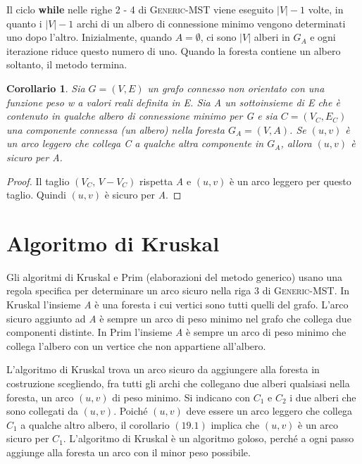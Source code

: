 \documentclass[10pt, a4paper]{report}
\newtheorem{corollario}{Corollario}[chapter]
\begin{document}
Il ciclo \textbf{while} nelle righe 2 - 4 di \textsc{Generic-MST} viene eseguito $|V| - 1$ volte, in quanto i $|V| - 1$ archi di un albero di connessione minimo vengono determinati uno dopo l'altro. Inizialmente, quando $A = \emptyset$, ci sono $|V|$  alberi in $G_{A}$ e ogni iterazione riduce questo numero di uno. Quando la foresta contiene un albero soltanto, il metodo termina.
\begin{corollario}
Sia $G = (V,E)$ un grafo connesso non orientato con una funzione peso \textit{w} a valori reali definita in \textit{E}. Sia \textit{A} un sottoinsieme di \textit{E} che è contenuto in qualche albero di connessione minimo per \textit{G} e sia $C = (V_{C},E_{C})$ una componente connessa (un albero) nella foresta $G_{A} = (V,A)$. Se $(u,v)$ è un arco leggero che collega \textit{C} a qualche altra componente in $G_{A}$, allora $(u,v)$ è sicuro per \textit{A}.
\end{corollario}
\begin{proof}
Il taglio $(V_{C},\,V - V_{C})$ rispetta \textit{A} e $(u,v)$ è un arco leggero per questo taglio. Quindi $(u,v)$ è sicuro per \textit{A}.
\end{proof}
\section{Algoritmo di Kruskal}
Gli algoritmi di Kruskal e Prim (elaborazioni del metodo generico) usano una regola specifica per determinare un arco sicuro nella riga 3 di \textsc{Generic-MST}. In Kruskal l'insieme \textit{A} è una foresta i cui vertici sono tutti quelli del grafo. L'arco sicuro aggiunto ad \textit{A} è sempre un arco di peso minimo nel grafo che collega due componenti distinte. In Prim l'insieme \textit{A} è sempre un arco di peso minimo che collega l'albero con un vertice che non appartiene all'albero. 

L'algoritmo di Kruskal trova un arco sicuro da aggiungere alla foresta in costruzione scegliendo, fra tutti gli archi che collegano due alberi qualsiasi nella foresta, un arco $(u,v)$ di peso minimo. Si indicano con $C_1$ e $C_2$ i due alberi che sono collegati da $(u,v)$. Poiché $(u,v)$ deve essere un arco leggero che collega $C_1$ a qualche altro albero, il corollario $(19.1)$ implica che $(u,v)$ è un arco sicuro per $C_1$. L'algoritmo di Kruskal è un algoritmo goloso, perché a ogni passo aggiunge alla foresta un arco con il minor peso possibile.
\end{document}
